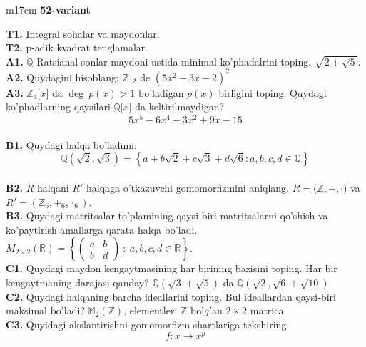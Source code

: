 \documentclass{article}
\begin{document}
\begin{tabular}{m{17cm}}
\textbf{52-variant}
\newline

\textbf{T1.} Integral sohalar va maydonlar. \\
\textbf{T2.} p-adik kvadrat tenglamalar. \\
\textbf{A1.} \(\mathbb{Q}\) Ratsianal sonlar maydoni ustida minimal ko'phadalrini toping.
\(\sqrt{2 + \sqrt{5}}\). \\
\textbf{A2.} Quydagini hisoblang:
\(\mathbb{Z}_{12}\) de \(\left( 5x^{2} + 3x - 2 \right)^{2}\) \\
\textbf{A3.} \(\mathbb{Z}_{4}\lbrack x\rbrack\) da \(\deg\ p(x) > 1\) bo'ladigan \(p(x)\) birligini toping. Quydagi ko'phadlarning qaysilari \(\mathbb{Q\lbrack}x\rbrack\) da keltirilmaydigan?
\[5x^{5} - 6x^{4} - 3x^{2} + 9x - 15\] \\
\textbf{B1.} Quydagi halqa bo'ladimi:
\[\mathbb{Q}\left( \sqrt{2},\sqrt{3} \right) = \left\{ a + b\sqrt{2} + c\sqrt{3} + d\sqrt{6}:a,b,c,d \in \mathbb{Q} \right\}\] \\
\textbf{B2.} \(R\) halqani \(R'\) halqaga o'tkazuvchi gomomorfizmini aniqlang.
\(R\mathbb{= (Z,} + , \cdot )\) va \(R' = (\mathbb{Z}_{6}, +_{6}, \cdot_{6})\). \\
\textbf{B3.} Quydagi matritsalar to'plamining qaysi biri matritsalarni qo'shish va ko'paytirish amallarga qarata halqa bo'ladi.
\(M_{2 \times 2}\mathbb{(R) =}\left\{ \begin{pmatrix}
a & b \\
b & d
\end{pmatrix}\ :\ a,b,c,d \in \mathbb{R} \right\}\). \\
\textbf{C1.} Quydagi maydon kengaytmasining har birining bazisini toping. Har bir kengaytmaning darajasi qanday?
\(\mathbb{Q}\left( \sqrt{3} + \sqrt{5} \right)\) da \(\mathbb{Q}\left( \sqrt{2},\sqrt{6} + \sqrt{10} \right)\) \\
\textbf{C2.} Quydagi halqaning barcha ideallarini toping. Bul ideallardan qaysi-biri maksimal bo'ladi?
\(\mathbb{M}_{2}\left( \mathbb{Z} \right)\), elementleri \(\mathbb{Z}\) bol\(g'\)an \(2 \times 2\) matrica \\
\textbf{C3.} Quyidagi akslantirishni gomomorfizm shartlariga tekshiring.
\[f:x \rightarrow x^{p}\] \\

\end{tabular}
\vspace{1cm}
\end{document}
